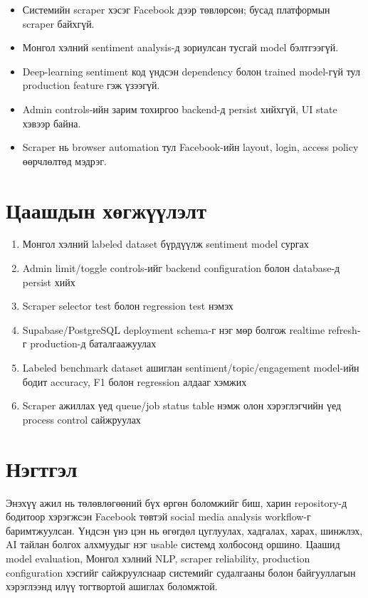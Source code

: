 \documentclass[
12pt,
oneside,
english,
onehalfspacing,
nolistspacing,
headsepline,
]{MUST-Thesis}
\begin{document}
\begin{itemize}
    \item Системийн scraper хэсэг Facebook дээр төвлөрсөн; бусад платформын scraper байхгүй.
    \item Монгол хэлний sentiment analysis-д зориулсан тусгай model бэлтгээгүй.
    \item Deep-learning sentiment код үндсэн dependency болон trained model-гүй тул production feature гэж үзээгүй.
    \item Admin controls-ийн зарим тохиргоо backend-д persist хийхгүй, UI state хэвээр байна.
    \item Scraper нь browser automation тул Facebook-ийн layout, login, access policy өөрчлөлтөд мэдрэг.
\end{itemize}

\section{Цаашдын хөгжүүлэлт}

\begin{enumerate}
    \item Монгол хэлний labeled dataset бүрдүүлж sentiment model сургах
    \item Admin limit/toggle controls-ийг backend configuration болон database-д persist хийх
    \item Scraper selector test болон regression test нэмэх
    \item Supabase/PostgreSQL deployment schema-г нэг мөр болгож realtime refresh-г production-д баталгаажуулах
    \item Labeled benchmark dataset ашиглан sentiment/topic/engagement model-ийн бодит accuracy, F1 болон regression алдааг хэмжих
    \item Scraper ажиллах үед queue/job status table нэмж олон хэрэглэгчийн үед process control сайжруулах
\end{enumerate}

\section{Нэгтгэл}

Энэхүү ажил нь төлөвлөгөөний бүх өргөн боломжийг биш, харин repository-д бодитоор хэрэгжсэн Facebook төвтэй social media analysis workflow-г баримтжуулсан. Үндсэн үнэ цэн нь өгөгдөл цуглуулах, хадгалах, харах, шинжлэх, AI тайлан болгох алхмуудыг нэг usable системд холбосонд оршино. Цаашид model evaluation, Монгол хэлний NLP, scraper reliability, production configuration хэсгийг сайжруулснаар системийг судалгааны болон байгууллагын хэрэглээнд илүү тогтвортой ашиглах боломжтой.
\end{document}
